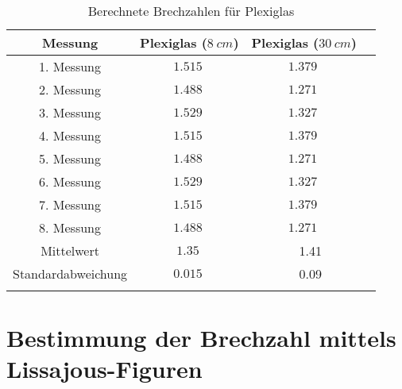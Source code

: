 \begin{table}[H]
    \begin{center}
        \caption{Berechnete Brechzahlen für Plexiglas}
        \begin{tabular}{cccc}
            \hline
            Messung            & Plexiglas ($\SI{8}{cm}$) & Plexiglas ($\SI{30}{cm}$)  \\
            \hline
            1. Messung         & $\SI{1,515}{}$            & $\SI{1,379}{}$ \\
            2. Messung         & $\SI{1,488}{}$            & $\SI{1,271}{}$ \\
            3. Messung         & $\SI{1,529}{}$            & $\SI{1,327}{}$ \\
            4. Messung         & $\SI{1,515}{}$            & $\SI{1,379}{}$ \\
            5. Messung         & $\SI{1,488}{}$            & $\SI{1,271}{}$ \\
            6. Messung         & $\SI{1,529}{}$            & $\SI{1,327}{}$ \\
            7. Messung         & $\SI{1,515}{}$            & $\SI{1,379}{}$ \\
            8. Messung         & $\SI{1,488}{}$            & $\SI{1,271}{}$ \\
            \hline
            Mittelwert         & $\SI{1,35}{}$        & \multicolumn{2}{c}{\SI{1,41}{}} \\
            Standardabweichung & $\SI{0,015}{}$       & \multicolumn{2}{c}{\SI{0,09}{}} \\
            \hline
            \label{tab:Ergebnisse-Brechzahlen}
        \end{tabular}
    \end{center}
\end{table}

\section{Bestimmung der Brechzahl mittels Lissajous-Figuren}